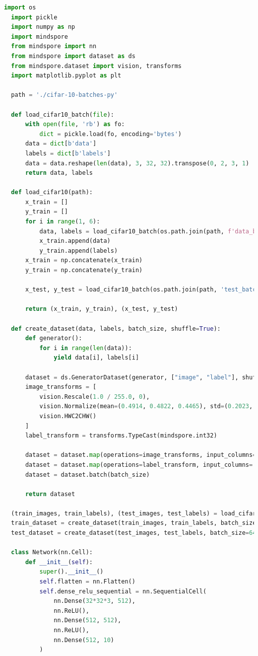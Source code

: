 \documentclass[12pt]{article}
\begin{document}
\begin{lstlisting}[language=Python]
  import os
  import pickle
  import numpy as np
  import mindspore
  from mindspore import nn
  from mindspore import dataset as ds
  from mindspore.dataset import vision, transforms
  import matplotlib.pyplot as plt
  
  path = './cifar-10-batches-py'
  
  def load_cifar10_batch(file):
      with open(file, 'rb') as fo:
          dict = pickle.load(fo, encoding='bytes')
      data = dict[b'data']
      labels = dict[b'labels']
      data = data.reshape(len(data), 3, 32, 32).transpose(0, 2, 3, 1)
      return data, labels
  
  def load_cifar10(path):
      x_train = []
      y_train = []
      for i in range(1, 6):
          data, labels = load_cifar10_batch(os.path.join(path, f'data_batch_{i}'))
          x_train.append(data)
          y_train.append(labels)
      x_train = np.concatenate(x_train)
      y_train = np.concatenate(y_train)
      
      x_test, y_test = load_cifar10_batch(os.path.join(path, 'test_batch'))
      
      return (x_train, y_train), (x_test, y_test)
  
  def create_dataset(data, labels, batch_size, shuffle=True):
      def generator():
          for i in range(len(data)):
              yield data[i], labels[i]
  
      dataset = ds.GeneratorDataset(generator, ["image", "label"], shuffle=shuffle)
      image_transforms = [
          vision.Rescale(1.0 / 255.0, 0),
          vision.Normalize(mean=(0.4914, 0.4822, 0.4465), std=(0.2023, 0.1994, 0.2010)),
          vision.HWC2CHW()
      ]
      label_transform = transforms.TypeCast(mindspore.int32)
      
      dataset = dataset.map(operations=image_transforms, input_columns='image')
      dataset = dataset.map(operations=label_transform, input_columns='label')
      dataset = dataset.batch(batch_size)
      
      return dataset
  
  (train_images, train_labels), (test_images, test_labels) = load_cifar10(path)
  train_dataset = create_dataset(train_images, train_labels, batch_size=64)
  test_dataset = create_dataset(test_images, test_labels, batch_size=64)
  
  class Network(nn.Cell):
      def __init__(self):
          super().__init__()
          self.flatten = nn.Flatten()
          self.dense_relu_sequential = nn.SequentialCell(
              nn.Dense(32*32*3, 512),
              nn.ReLU(),
              nn.Dense(512, 512),
              nn.ReLU(),
              nn.Dense(512, 10)
          )
  

\end{lstlisting}
\end{document}
